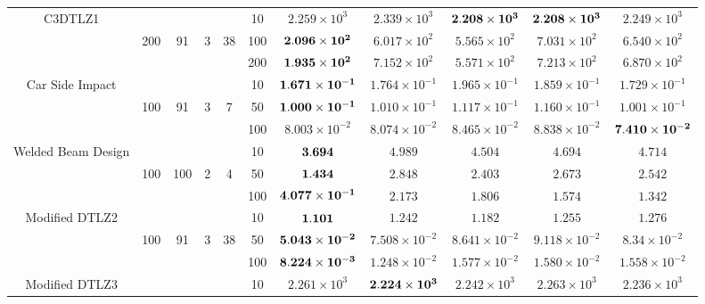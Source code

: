 \documentclass[../main/main]{subfiles}
\begin{document}
\begin{table}[htbp]
\begin{tabular}{c|ccccc|c|c|c|c|c}
\hline
\multirow{3}{*}{C3DTLZ1} &       && &       & 10 &$2.259 \times 10^{3}$ & $2.339 \times 10^{3}$ & $\bf{2.208 \times 10^{3}}$ & $\bf{2.208 \times 10^{3}}$ & $2.249 \times 10^{3}$\\
                                          &200 & 91 & 3 & 38 &100 &$\bf{2.096 \times 10^{2}}$ & $6.017 \times 10^{2}$ & $5.565 \times 10^{2}$ & $7.031 \times 10^{2}$ & $6.540 \times 10^{2}$\\
				   &        &    &&    &200 &$\bf{1.935 \times 10^{2}}$ & $7.152 \times 10^{2}$ & $5.571 \times 10^{2}$ & $7.213 \times 10^{2}$ & $6.870 \times 10^{2}$\\
				   \hline
\multirow{3}{*}{\scriptsize Car Side Impact}&  &&      &       & 10 &$\bf{1.671 \times 10^{-1}}$ & $1.764 \times 10^{-1}$ & $1.965 \times 10^{-1}$ & $1.859 \times 10^{-1}$ & $1.729 \times 10^{-1}$\\
  				   & 100 & 91 & 3 & 7 &50 &$\bf{1.000 \times 10^{-1}}$ & $1.010 \times 10^{-1}$ & $1.117 \times 10^{-1}$ & $1.160 \times 10^{-1}$ & $1.001 \times 10^{-1}$\\
				   &        &      &&  &100 &$8.003 \times 10^{-2}$ & $8.074 \times 10^{-2}$ & $8.465 \times 10^{-2}$ & $8.838 \times 10^{-2}$ & $\bf{7.410 \times 10^{-2}}$\\
\hline
\multirow{3}{*}{\fontsize{6pt}{0pt}\selectfont Welded Beam Design} & &&       &       & 10 &$\bf{3.694}$ & $4.989$ & $4.504$ & $4.694$ & $4.714$\\
  				   & 100 & 100 & 2 & 4 &50 &$\bf{1.434}$ & $2.848$ & $2.403$ & $2.673$ & $2.542$\\
				   &        &      &&  &100 &$\bf{4.077 \times 10^{-1}}$ & $2.173$ & $1.806$ & $1.574$ & $1.342$\\
\hline
\multirow{3}{*}{\fontsize{6.5pt}{0pt}\selectfont Modified DTLZ2} & &&       &       & 10 &$\bf{1.101}$ & $1.242$ & $1.182$ & $1.255$ & $1.276$\\
  				   & 100 & 91 & 3 & 38 &50 &$\bf{5.043 \times 10^{-2}}$ & $7.508 \times 10^{-2}$ & $8.641 \times 10^{-2}$ & $9.118 \times 10^{-2}$ & $8.34 \times 10^{-2}$\\
				   &        &      &&  &100 &$\bf{8.224 \times 10^{-3}}$ & $1.248 \times 10^{-2}$ & $1.577 \times 10^{-2}$ & $1.580 \times 10^{-2}$ & $1.558 \times 10^{-2}$\\
\hline
\multirow{3}{*}{\fontsize{6.5pt}{0pt}\selectfont Modified DTLZ3} & &&       &       & 10 &$2.261 \times 10^{3}$ & $\bf{2.224 \times 10^{3}}$ & $2.242 \times 10^{3}$ & $2.263 \times 10^{3}$ & $2.236 \times 10^{3}$\\

\end{tabular}
\end{table}
\end{document}
